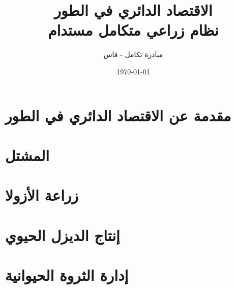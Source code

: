 \documentclass[12pt,a4paper]{report}
\title{الاقتصاد الدائري في الطور\\
\large نظام زراعي متكامل مستدام}
\author{مبادرة تكامل - فاس}
\date{\today}
\begin{document}


\maketitle

\tableofcontents
\clearpage

\chapter{مقدمة عن الاقتصاد الدائري في الطور}

\chapter{المشتل}









\chapter{زراعة الأزولا}









\chapter{إنتاج الديزل الحيوي}









\chapter{إدارة الثروة الحيوانية}








\end{document}
